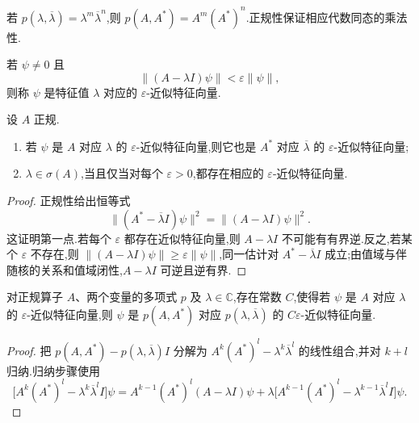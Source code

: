若 \(p(\lambda,\overline\lambda)=\lambda^{m}\overline\lambda^{n}\),则 \(p(A,A^{*})=A^{m}(A^{*})^{n}\).正规性保证相应代数同态的乘法性.

\begin{definition}\label{def:epsilon-almost-eigenvector}
若 \(\psi\neq0\) 且
\[
\|(A-\lambda I)\psi\|<\varepsilon\|\psi\|,
\]
则称 \(\psi\) 是特征值 \(\lambda\) 对应的 \(\varepsilon\)-近似特征向量.
\end{definition}

\begin{lemma}[正规算子的近似特征向量]\label{lem:normal-almost-eigenvector}
设 \(A\) 正规.
\begin{enumerate}
\item 若 \(\psi\) 是 \(A\) 对应 \(\lambda\) 的 \(\varepsilon\)-近似特征向量,则它也是 \(A^{*}\) 对应 \(\overline\lambda\) 的 \(\varepsilon\)-近似特征向量;
\item \(\lambda\in\sigma(A)\),当且仅当对每个 \(\varepsilon>0\),都存在相应的 \(\varepsilon\)-近似特征向量.
\end{enumerate}
\end{lemma}

\begin{proof}
正规性给出恒等式
\[
\|(A^{*}-\overline\lambda I)\psi\|^{2}
=\|(A-\lambda I)\psi\|^{2}.
\]
这证明第一点.若每个 \(\varepsilon\) 都存在近似特征向量,则 \(A-\lambda I\) 不可能有有界逆.反之,若某个 \(\varepsilon\) 不存在,则 \(\|(A-\lambda I)\psi\|\geq\varepsilon\|\psi\|\),同一估计对 \(A^{*}-\overline\lambda I\) 成立;由值域与伴随核的关系和值域闭性,\(A-\lambda I\) 可逆且逆有界.
\end{proof}

\begin{lemma}[近似特征向量的多项式估计]\label{lem:normal-polynomial-almost}
对正规算子 \(A\)、两个变量的多项式 \(p\) 及 \(\lambda\in\mathbb{C}\),存在常数 \(C\),使得若 \(\psi\) 是 \(A\) 对应 \(\lambda\) 的 \(\varepsilon\)-近似特征向量,则 \(\psi\) 是 \(p(A,A^{*})\) 对应 \(p(\lambda,\overline\lambda)\) 的 \(C\varepsilon\)-近似特征向量.
\end{lemma}

\begin{proof}
把 \(p(A,A^{*})-p(\lambda,\overline\lambda)I\) 分解为 \(A^{k}(A^{*})^{l}-\lambda^{k}\overline\lambda^{l}\) 的线性组合,并对 \(k+l\) 归纳.归纳步骤使用
\[
\bigl[A^{k}(A^{*})^{l}-\lambda^{k}\overline\lambda^{l}I\bigr]\psi
=A^{k-1}(A^{*})^{l}(A-\lambda I)\psi
+\lambda\bigl[A^{k-1}(A^{*})^{l}-\lambda^{k-1}\overline\lambda^{l}I\bigr]\psi.
\]
\end{proof}


